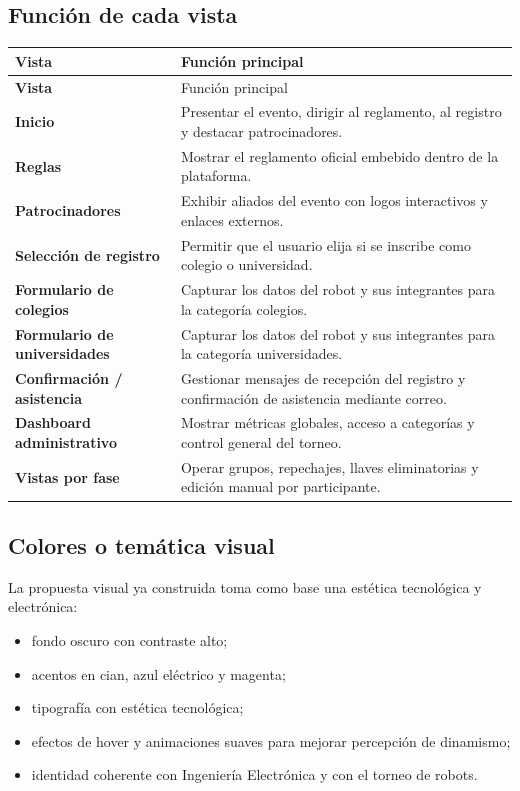 \documentclass[12pt,a4paper]{article}
\begin{document}
\subsection{Función de cada vista}

\begin{longtable}{>{\bfseries}p{4.2cm}p{9.5cm}}
\toprule
Vista & Función principal \\
\midrule
\endfirsthead
\toprule
Vista & Función principal \\
\midrule
\endhead
Inicio & Presentar el evento, dirigir al reglamento, al registro y destacar patrocinadores. \\
Reglas & Mostrar el reglamento oficial embebido dentro de la plataforma. \\
Patrocinadores & Exhibir aliados del evento con logos interactivos y enlaces externos. \\
Selección de registro & Permitir que el usuario elija si se inscribe como colegio o universidad. \\
Formulario de colegios & Capturar los datos del robot y sus integrantes para la categoría colegios. \\
Formulario de universidades & Capturar los datos del robot y sus integrantes para la categoría universidades. \\
Confirmación / asistencia & Gestionar mensajes de recepción del registro y confirmación de asistencia mediante correo. \\
Dashboard administrativo & Mostrar métricas globales, acceso a categorías y control general del torneo. \\
Vistas por fase & Operar grupos, repechajes, llaves eliminatorias y edición manual por participante. \\
\bottomrule
\end{longtable}

\subsection{Colores o temática visual}

La propuesta visual ya construida toma como base una estética tecnológica y electrónica:

\begin{itemize}[leftmargin=1.2cm]
    \item fondo oscuro con contraste alto;
    \item acentos en cian, azul eléctrico y magenta;
    \item tipografía con estética tecnológica;
    \item efectos de hover y animaciones suaves para mejorar percepción de dinamismo;
    \item identidad coherente con Ingeniería Electrónica y con el torneo de robots.
\end{itemize}
\end{document}
